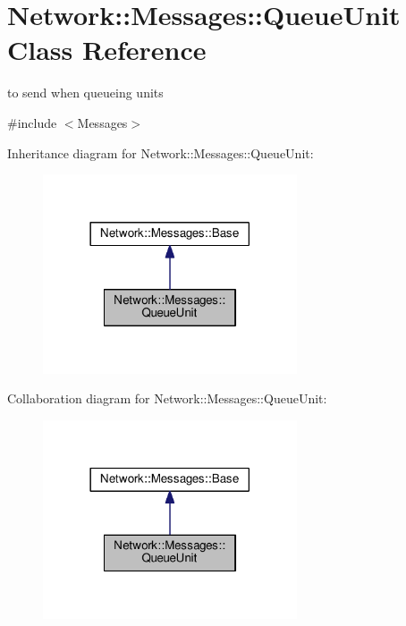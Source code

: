\hypertarget{class_network_1_1_messages_1_1_queue_unit}{}\section{Network\+:\+:Messages\+:\+:Queue\+Unit Class Reference}
\label{class_network_1_1_messages_1_1_queue_unit}


to send when queueing units  




{\ttfamily \#include $<$Messages$>$}



Inheritance diagram for Network\+:\+:Messages\+:\+:Queue\+Unit\+:
\nopagebreak
\begin{figure}[H]
\begin{center}
\leavevmode
\includegraphics[width=213pt]{class_network_1_1_messages_1_1_queue_unit__inherit__graph}
\end{center}
\end{figure}


Collaboration diagram for Network\+:\+:Messages\+:\+:Queue\+Unit\+:
\nopagebreak
\begin{figure}[H]
\begin{center}
\leavevmode
\includegraphics[width=213pt]{class_network_1_1_messages_1_1_queue_unit__coll__graph}
\end{center}
\end{figure}
